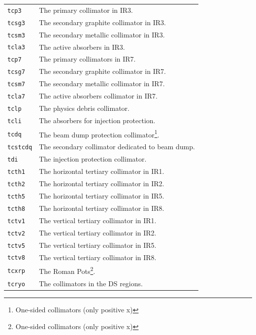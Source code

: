 \bigskip
\begin{longtabu}{@{}ll}
    \texttt{tcp3}    & The primary collimator in IR3. \\
    \texttt{tcsg3}   & The secondary graphite collimator in IR3. \\
    \texttt{tcsm3}   & The secondary metallic collimator in IR3. \\
    \texttt{tcla3}   & The active absorbers in IR3. \\
    \texttt{tcp7}    & The primary collimators in IR7. \\
    \texttt{tcsg7}   & The secondary graphite collimator in IR7. \\
    \texttt{tcsm7}   & The secondary metallic collimator in IR7. \\
    \texttt{tcla7}   & The active absorbers collimator in IR7. \\
    \texttt{tclp}    & The physics debris collimator. \\
    \texttt{tcli}    & The absorbers for injection protection. \\
    \texttt{tcdq}    & The beam dump protection collimator\footnote{One-sided collimators (only positive x)}. \\
    \texttt{tcstcdq} & The secondary collimator dedicated to beam dump. \\
    \texttt{tdi}     & The injection protection collimator. \\
    \texttt{tcth1}   & The horizontal tertiary collimator in IR1. \\
    \texttt{tcth2}   & The horizontal tertiary collimator in IR2. \\
    \texttt{tcth5}   & The horizontal tertiary collimator in IR5. \\
    \texttt{tcth8}   & The horizontal tertiary collimator in IR8. \\
    \texttt{tctv1}   & The vertical tertiary collimator in IR1. \\
    \texttt{tctv2}   & The vertical tertiary collimator in IR2. \\
    \texttt{tctv5}   & The vertical tertiary collimator in IR5. \\
    \texttt{tctv8}   & The vertical tertiary collimator in IR8. \\
    \texttt{tcxrp}   & The Roman Pots\footnote{One-sided collimators (only positive x)}. \\
    \texttt{tcryo}   & The collimators in the DS regions.
\end{longtabu}

